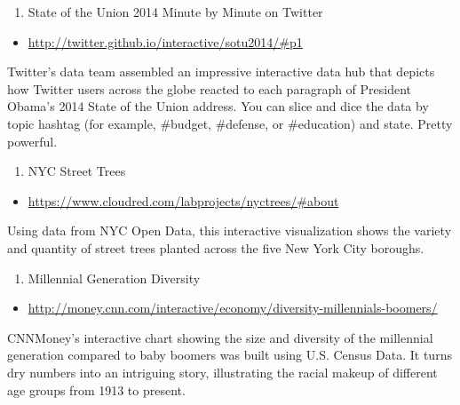 \documentclass[]{book}
\providecommand{\tightlist}{%
  \setlength{\itemsep}{0pt}\setlength{\parskip}{0pt}}
\theoremstyle{definition}
\theoremstyle{definition}
\theoremstyle{definition}
\theoremstyle{remark}
\begin{document}
\begin{enumerate}
\def\labelenumi{\arabic{enumi}.}
\setcounter{enumi}{6}
\tightlist
\item
  State of the Union 2014 Minute by Minute on Twitter
\end{enumerate}

\begin{itemize}
\tightlist
\item
  \url{http://twitter.github.io/interactive/sotu2014/\#p1}
\end{itemize}

Twitter's data team assembled an impressive interactive data hub that
depicts how Twitter users across the globe reacted to each paragraph of
President Obama's 2014 State of the Union address. You can slice and
dice the data by topic hashtag (for example, \#budget, \#defense, or
\#education) and state. Pretty powerful.

\begin{enumerate}
\def\labelenumi{\arabic{enumi}.}
\setcounter{enumi}{7}
\tightlist
\item
  NYC Street Trees
\end{enumerate}

\begin{itemize}
\tightlist
\item
  \url{https://www.cloudred.com/labprojects/nyctrees/\#about}
\end{itemize}

Using data from NYC Open Data, this interactive visualization shows the
variety and quantity of street trees planted across the five New York
City boroughs.

\begin{enumerate}
\def\labelenumi{\arabic{enumi}.}
\setcounter{enumi}{8}
\tightlist
\item
  Millennial Generation Diversity
\end{enumerate}

\begin{itemize}
\tightlist
\item
  \url{http://money.cnn.com/interactive/economy/diversity-millennials-boomers/}
\end{itemize}

CNNMoney's interactive chart showing the size and diversity of the
millennial generation compared to baby boomers was built using U.S.
Census Data. It turns dry numbers into an intriguing story, illustrating
the racial makeup of different age groups from 1913 to present.
\end{document}
